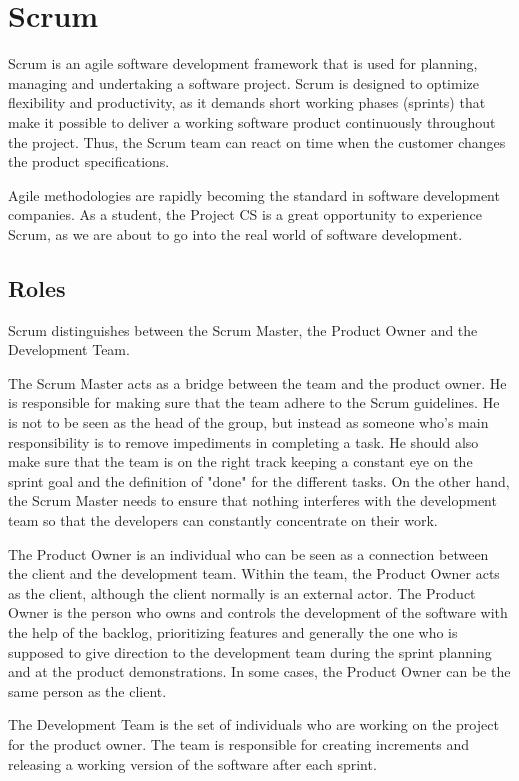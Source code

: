\section{Scrum}
\label{sec:scrum}
Scrum is an agile software development framework that is used for planning, managing
and undertaking a software project. Scrum is designed to optimize flexibility and productivity,
as it demands short working phases (sprints) that make it possible to deliver
a working software product continuously throughout the project. Thus, the Scrum team
can react on time when the customer changes the product specifications.

Agile methodologies are rapidly becoming the standard
in software development companies. As a student, the Project CS is a great opportunity
to experience Scrum, as we are about to go into the real world of software development.

\subsection{Roles}

Scrum distinguishes between the Scrum Master, the Product Owner and the Development Team.

The Scrum Master acts as a bridge between the team and the product owner. 
He is responsible for making sure that the team adhere to the Scrum guidelines. He is not to be seen as the head of the group, but instead as someone who's main responsibility is to remove impediments in completing a task.
He should also make sure that the team is on the right track keeping a constant eye on the sprint goal
and the definition of "done" for the different tasks. On the other hand, the Scrum Master
needs to ensure that nothing interferes with the development team so that the developers
can constantly concentrate on their work.

The Product Owner is an individual who can be seen as a connection between the client and
the development team. Within the team, the Product Owner acts as the client, although the client normally is an external actor.
The Product Owner is the person who owns and controls the development of the software with the help of the backlog,
prioritizing features and generally the one who is supposed to give direction to the development team during the sprint planning and at the product demonstrations.
In some cases, the Product Owner can be the same person as the client.

The Development Team is the set of individuals who are working on the project for the product owner.
The team is responsible for creating increments and releasing a working version of the software
after each sprint.


